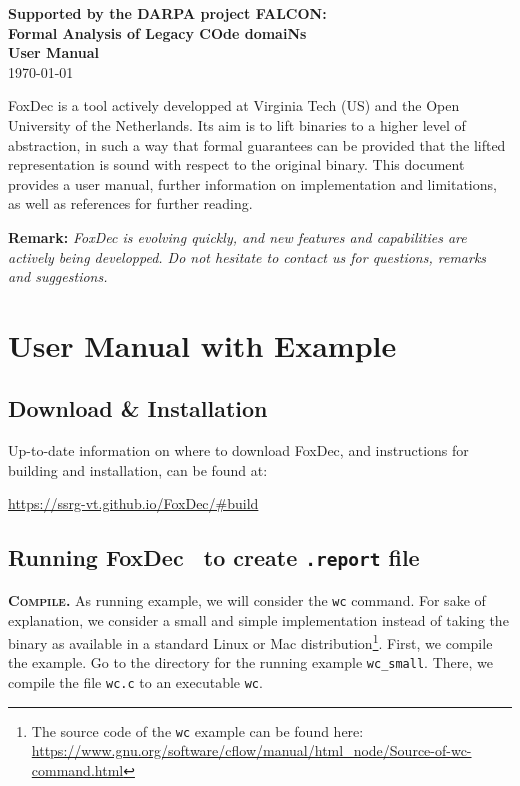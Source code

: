 \documentclass[12pt,a4paper]{article}
\newcommand{\foxdec}{\textsf{FoxDec}}
\newcommand{\beginpar}[1]{\noindent\textsc{\textbf{#1.}}}
\newcounter{example}
\begin{document}
\begin{titlepage}
\vspace{15mm}

\textbf{Supported by the DARPA project FALCON: \\ Formal Analysis of Legacy COde domaiNs}\\
\bigskip
\Large {\color{BleuFonce} \textbf{User Manual}}
\\
\normalsize {\today}



\end{titlepage}

\restoregeometry
\newpage

\setcounter{page}{1} 

FoxDec is a tool actively developped at Virginia Tech (US) and the Open University of the Netherlands.
Its aim is to lift binaries to a higher level of abstraction, in such a way that formal guarantees can be provided that the lifted representation is sound with respect to the original binary.
This document provides a user manual, further information on implementation and limitations, as well as references for further reading.

\textbf{Remark:}
\textit{
FoxDec is evolving quickly, and new features and capabilities are actively being developped.
Do not hesitate to contact us for questions, remarks and suggestions.
}


\section{User Manual with Example}


\subsection{Download \& Installation}

Up-to-date information on where to download \foxdec, and instructions for building and installation, can be found at:
\begin{center}
\url{https://ssrg-vt.github.io/FoxDec/#build}
\end{center}


\subsection{Running \foxdec~ to create \texttt{.report} file}

\beginpar{Compile} As running example, we will consider the \texttt{wc} command.
For sake of explanation, we consider a small and simple implementation instead of taking the binary as available in a standard Linux or Mac distribution\footnote{The source code of the \texttt{wc} example can be found here:\\\url{https://www.gnu.org/software/cflow/manual/html_node/Source-of-wc-command.html}}.
First, we compile the example. 
Go to the directory for the running example \texttt{wc\_small}.
There, we compile the file \texttt{wc.c} to an executable \texttt{wc}.
\end{document}
